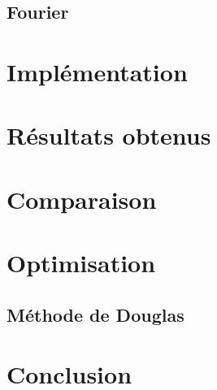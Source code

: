 \documentclass{article}
\begin{document}
\subsection{Fourier}

\section{Implémentation}

\section{Résultats obtenus}

\section{Comparaison}

\section{Optimisation}
\subsection{Méthode de Douglas}

\section{Conclusion}

\end{document}
